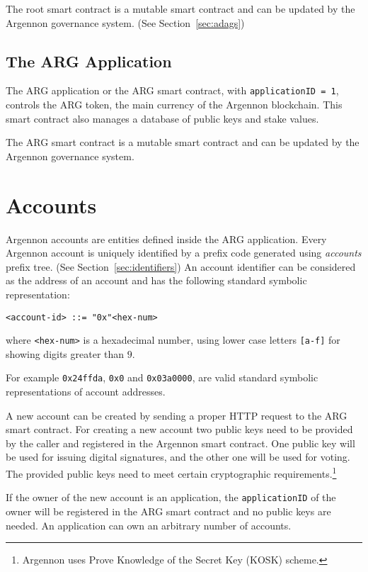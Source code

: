 The root smart contract is a mutable smart contract and can be updated by the Argennon governance system.
(See Section~\ref{sec:adags})

\subsection{The ARG Application}\label{subsec:the-arg-app}

The ARG application or the ARG smart contract,
with \texttt{applicationID = 1}, controls the ARG token, the main
currency of the Argennon blockchain. This smart contract also manages a database of public keys and stake values.

The ARG smart contract is a mutable smart contract and can be updated by the Argennon governance system.


\section{Accounts}\label{sec:accounts}

Argennon accounts are entities defined inside the ARG application.
Every Argennon account is uniquely identified by a prefix code generated using \emph{accounts} prefix
tree. (See Section~\ref{sec:identifiers}) An account
identifier can be considered as the address of an account and has the following standard symbolic representation:
\begin{verbatim}
<account-id> ::= "0x"<hex-num>
\end{verbatim}
where \texttt{<hex-num>} is a hexadecimal number, using lower case
letters \texttt{[a-f]} for showing digits greater than $9$.

For example \texttt{0x24ffda}, \texttt{0x0} and \texttt{0x03a0000}, are valid standard symbolic
representations of account addresses.

A new account can be created by sending a proper HTTP request to the ARG smart contract. For creating
a new account two public keys need to be provided by the caller and registered in the Argennon smart contract.
One public key will be used for issuing digital signatures, and the other one will be used for voting. The
provided public keys need to meet certain cryptographic requirements.\footnote{Argennon uses Prove
Knowledge of the Secret Key (KOSK) scheme.}

If the owner of the new account is an application, the \texttt{applicationID} of the owner will be registered in the
ARG smart contract and no public keys are needed. An application can own an arbitrary number of accounts.


